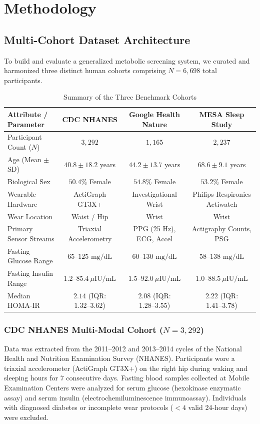 \documentclass[12pt,a4paper,oneside]{report}
\begin{document}
\chapter{Methodology}

\section{Multi-Cohort Dataset Architecture}
To build and evaluate a generalized metabolic screening system, we curated and harmonized three distinct human cohorts comprising $N = 6,698$ total participants.

\begin{table}[h!]
\centering
\small
\caption{Summary of the Three Benchmark Cohorts}
\begin{tabularx}{\textwidth}{lccc}
\toprule
\textbf{Attribute / Parameter} & \textbf{CDC NHANES} & \textbf{Google Health Nature} & \textbf{MESA Sleep Study} \\
\midrule
Participant Count ($N$) & $3,292$ & $1,165$ & $2,237$ \\
Age (Mean $\pm$ SD) & $40.8 \pm 18.2$ years & $44.2 \pm 13.7$ years & $68.6 \pm 9.1$ years \\
Biological Sex & $50.4\%$ Female & $54.8\%$ Female & $53.2\%$ Female \\
Wearable Hardware & ActiGraph GT3X+ & Investigational Wrist & Philips Respironics Actiwatch \\
Wear Location & Waist / Hip & Wrist & Wrist \\
Primary Sensor Streams & Triaxial Accelerometry & PPG (25 Hz), ECG, Accel & Actigraphy Counts, PSG \\
Fasting Glucose Range & $65\text{--}125\text{ mg/dL}$ & $60\text{--}130\text{ mg/dL}$ & $58\text{--}138\text{ mg/dL}$ \\
Fasting Insulin Range & $1.2\text{--}85.4\ \mu\text{IU/mL}$ & $1.5\text{--}92.0\ \mu\text{IU/mL}$ & $1.0\text{--}88.5\ \mu\text{IU/mL}$ \\
Median HOMA-IR & $2.14$ (IQR: $1.32\text{--}3.62$) & $2.08$ (IQR: $1.28\text{--}3.55$) & $2.22$ (IQR: $1.41\text{--}3.78$) \\
\bottomrule
\end{tabularx}
\label{tab:dataset_composition}
\end{table}

\subsection{CDC NHANES Multi-Modal Cohort ($N = 3,292$)}
Data was extracted from the 2011--2012 and 2013--2014 cycles of the National Health and Nutrition Examination Survey (NHANES). Participants wore a triaxial accelerometer (ActiGraph GT3X+) on the right hip during waking and sleeping hours for 7 consecutive days. Fasting blood samples collected at Mobile Examination Centers were analyzed for serum glucose (hexokinase enzymatic assay) and serum insulin (electrochemiluminescence immunoassay). Individuals with diagnosed diabetes or incomplete wear protocols ($< 4$ valid 24-hour days) were excluded.
\end{document}
